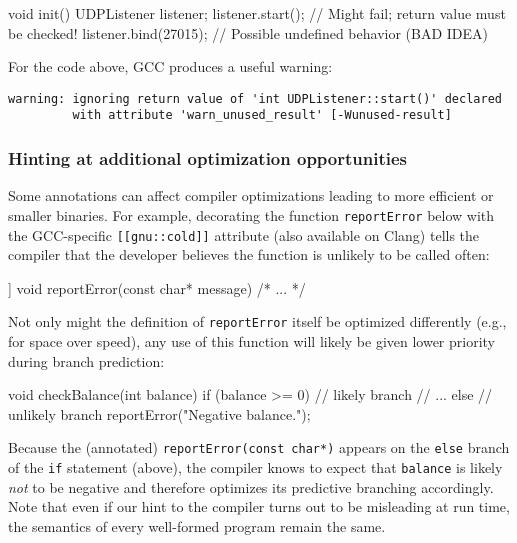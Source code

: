 \begin{emcppslisting}[emcppsbatch=e5]
void init()
{
    UDPListener listener;
    listener.start();      // Might fail; return value must be checked!
    listener.bind(27015);  // Possible undefined behavior (BAD IDEA)
}
\end{emcppslisting}

\noindent For the code above, GCC produces a useful warning:

\begin{lstlisting}[style=plain]
warning: ignoring return value of 'int UDPListener::start()' declared
         with attribute 'warn_unused_result' [-Wunused-result]
\end{lstlisting}


\subsubsection[Hinting at additional optimization opportunities]{Hinting at additional optimization opportunities}\label{hinting-at-additional-optimization-opportunities}

Some annotations can affect compiler optimizations leading to more
efficient or smaller binaries. For example, decorating the function
\lstinline!reportError! below with the GCC-specific
\lstinline![[gnu::cold]]! attribute (also available on Clang) tells the
compiler that the developer believes the function is unlikely to be
called often:

\begin{emcppslisting}[emcppsbatch=e6]
[[gnu::cold]] void reportError(const char* message) { /* ... */ }
\end{emcppslisting}

\noindent Not only might the definition of \lstinline!reportError! itself be
optimized differently (e.g., for space over speed), any use of this
function will likely be given lower priority during branch \mbox{prediction}:

\begin{emcppslisting}[emcppsbatch=e6]
void checkBalance(int balance)
{
    if (balance >= 0)  // likely branch
    {
        // ...
    }
    else  // unlikely branch
    {
        reportError("Negative balance.");
    }
}
\end{emcppslisting}

\noindent Because the (annotated) \lstinline!reportError(const!~\lstinline!char*)!
appears on the \lstinline!else! branch of the \lstinline!if! statement (above), the compiler
knows to expect that \lstinline!balance! is likely \emph{not} to be
negative and therefore optimizes its predictive branching accordingly.
Note that even if our hint to the compiler turns out to be misleading at
run time, the semantics of every well-formed program remain the same.

